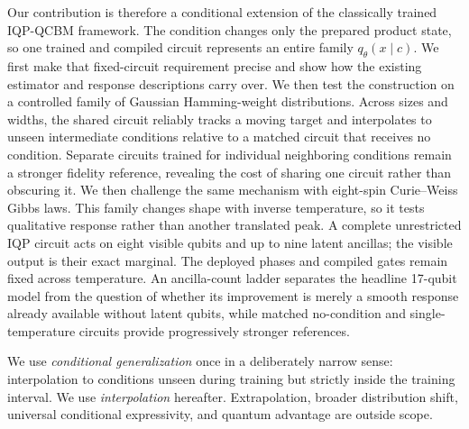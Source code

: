 \documentclass[a4paper,twocolumn,11pt,unpublished]{quantumarticle}
\begin{document}
Our contribution is therefore a conditional extension of the classically
trained IQP-QCBM framework.  The condition changes only the prepared product
state, so one trained and compiled circuit represents an entire family
$q_\theta(x\mid c)$.  We first make that fixed-circuit requirement precise and
show how the existing estimator and response descriptions carry over.  We then
test the construction on a controlled family of Gaussian Hamming-weight
distributions.  Across sizes and widths, the shared circuit reliably tracks a
moving target and interpolates to unseen intermediate conditions relative to
a matched circuit that receives no condition.  Separate circuits trained for
individual neighboring conditions remain a stronger fidelity reference,
revealing the cost of sharing one circuit rather than obscuring it.  We then
challenge the same mechanism with eight-spin Curie--Weiss Gibbs laws.  This
family changes shape with inverse temperature, so it tests qualitative response
rather than another translated peak.  A complete unrestricted IQP circuit acts
on eight visible qubits and up to nine latent ancillas; the visible output is
their exact marginal.  The deployed phases and compiled gates remain fixed
across temperature.  An ancilla-count ladder separates the headline 17-qubit
model from the question of whether its improvement is merely a smooth response
already available without latent qubits, while matched no-condition and
single-temperature circuits provide progressively stronger references.

We use \emph{conditional generalization} once in a deliberately narrow sense:
interpolation to conditions unseen during training but strictly inside the
training interval.  We use \emph{interpolation} hereafter.  Extrapolation,
broader distribution shift, universal conditional expressivity, and quantum
advantage are outside scope.
\end{document}
